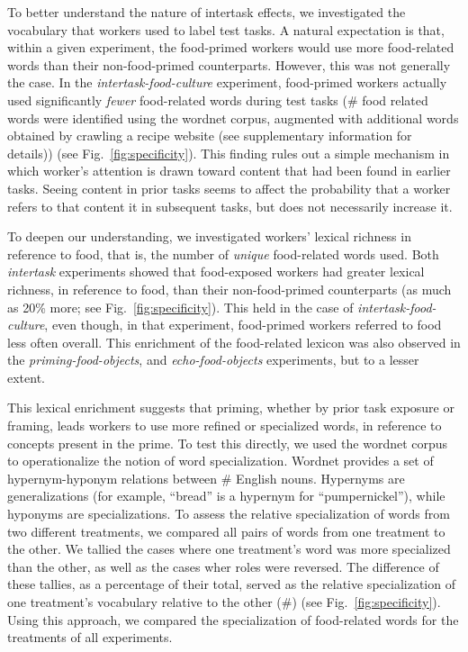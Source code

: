 \documentclass[12pt]{article}
\begin{document}
To better understand the nature of 
intertask effects, we investigated the vocabulary
that workers used to label test tasks. A natural expectation is that, within
a given experiment, the food-primed workers would use more food-related words 
than their non-food-primed counterparts.  However, this was not generally 
the case. In the \textit{intertask-food-culture} experiment, food-primed
workers actually used significantly \textit{fewer} food-related words 
during test tasks
(\# food related words were identified using the wordnet corpus, augmented
with additional words obtained by crawling a recipe website (see supplementary
information for details)) (see Fig.~\ref{fig:specificity}).  This finding
rules out a simple mechanism in which worker's attention is drawn toward
content that had been found in earlier tasks.  Seeing content in prior tasks 
seems to affect the probability that a worker refers to that content it in 
subsequent tasks, but does not necessarily increase it.

To deepen our understanding, we investigated workers' lexical richness in 
reference to food, that is, the number of \textit{unique} food-related words
used.
Both \textit{intertask} experiments showed that food-exposed workers had 
greater lexical richness, in reference to food, than their non-food-primed 
counterparts (as much as 20\% more; see Fig.~\ref{fig:specificity}).  This
held in the case of \textit{intertask-food-culture}, even though, in that 
experiment, food-primed workers referred to food less often overall.  
This enrichment of the food-related lexicon 
was also observed in the \textit{priming-food-objects}, and 
\textit{echo-food-objects} experiments, but to a lesser extent.

This lexical enrichment suggests that priming, whether by prior task 
exposure or framing, leads workers to use more refined 
or specialized words, in reference to concepts present in the prime.
To test this directly, we used the wordnet corpus to operationalize the 
notion of word specialization.
Wordnet provides a set of hypernym-hyponym relations between \# English 
nouns.  
Hypernyms are generalizations (for example, ``bread'' is a hypernym for 
``pumpernickel''), while hyponyms are specializations.
To assess the relative specialization of words from two different treatments,
we compared all pairs of words from one treatment to the other. 
We tallied the cases where one treatment's word was more specialized
than the other, as well as the cases wher roles were reversed.  
The difference of these tallies, as a percentage of their total, served as 
the relative specialization of one treatment's vocabulary relative to the 
other (\#) (see Fig.~\ref{fig:specificity}).  
Using this approach, we compared the specialization of food-related words 
for the treatments of all experiments.
\end{document}
